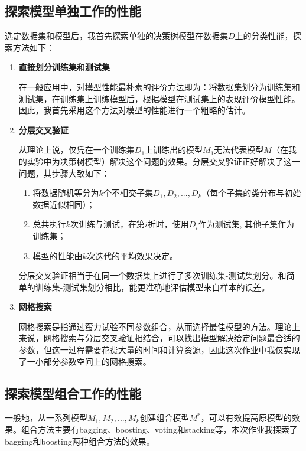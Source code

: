 \documentclass[12pt,a4paper]{article}
\theoremstyle{definition}
\begin{document}
\subsection{探索模型单独工作的性能}

选定数据集和模型后，我首先探索单独的决策树模型在数据集$D$上的分类性能，探索方法如下：

\begin{enumerate}
\item \textbf{直接划分训练集和测试集}

在一般应用中，对模型性能最朴素的评价方法即为：将数据集划分为训练集和测试集，在训练集上训练模型后，根据模型在测试集上的表现评价模型性能。因此，我首先采用这个方法对模型的性能进行一个粗略的估计。

\item \textbf{分层交叉验证}

从理论上说，仅凭在一个训练集$D_1$上训练出的模型$M_1$无法代表模型$M$（在我的实验中为决策树模型）解决这个问题的效果。分层交叉验证正好解决了这一问题，其步骤大致如下：

\begin{enumerate}
	\item 将数据随机等分为$k$个不相交子集$D_1, D_2, ... ,D_k$（每个子集的类分布与初始数据近似相同）；
	
	\item 总共执行$k$次训练与测试，在第$i$折时，使用$D_i$作为测试集, 其他子集作为训练集；
	
	\item 模型的性能由$k$次迭代的平均效果决定。
\end{enumerate}

分层交叉验证相当于在同一个数据集上进行了多次训练集-测试集划分。和简单的训练集-测试集划分相比，能更准确地评估模型来自样本的误差。

\item \textbf{网格搜索}

网格搜索是指通过蛮力试验不同参数组合，从而选择最佳模型的方法。理论上来说，网格搜索与分层交叉验证相结合，可以找出模型解决给定问题最合适的参数，但这一过程需要花费大量的时间和计算资源，因此这次作业中我仅实现了一小部分参数空间上的网格搜索。

\end{enumerate}

\subsection{探索模型组合工作的性能}

一般地，从一系列模型$M_1, M_2, ... , M_k$创建组合模型$M^*$，可以有效提高原模型的效果。组合方法主要有bagging、boosting、voting和stacking等，本次作业我探索了bagging和boosting两种组合方法的效果。
\end{document}
